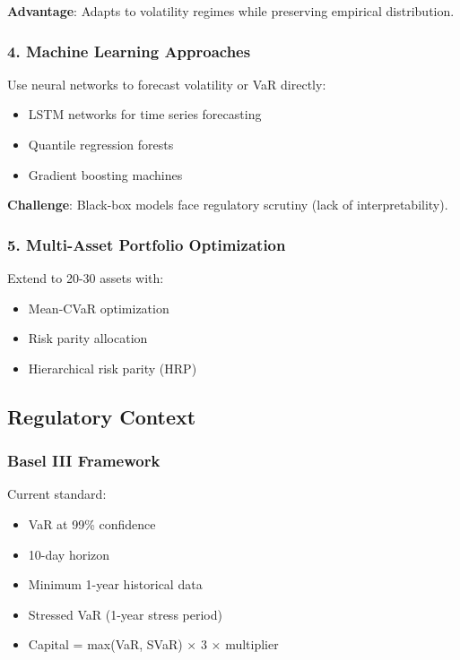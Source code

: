 \documentclass[12pt,a4paper]{article}
\begin{document}
\textbf{Advantage}: Adapts to volatility regimes while preserving empirical distribution.

\subsubsection{4. Machine Learning Approaches}

Use neural networks to forecast volatility or VaR directly:
\begin{itemize}
    \item LSTM networks for time series forecasting
    \item Quantile regression forests
    \item Gradient boosting machines
\end{itemize}

\textbf{Challenge}: Black-box models face regulatory scrutiny (lack of interpretability).

\subsubsection{5. Multi-Asset Portfolio Optimization}

Extend to 20-30 assets with:
\begin{itemize}
    \item Mean-CVaR optimization
    \item Risk parity allocation
    \item Hierarchical risk parity (HRP)
\end{itemize}

\subsection{Regulatory Context}

\subsubsection{Basel III Framework}

Current standard:
\begin{itemize}
    \item VaR at 99\% confidence
    \item 10-day horizon
    \item Minimum 1-year historical data
    \item Stressed VaR (1-year stress period)
    \item Capital = max(VaR, SVaR) × 3 × multiplier
\end{itemize}
\end{document}
